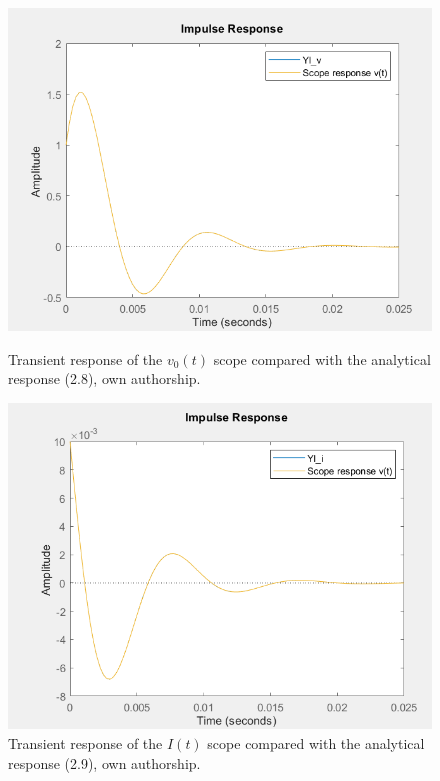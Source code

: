 \documentclass[a4paper,12pt]{article}
\begin{document}
\begin{figure}[H]
    \centering
    \begin{minipage}[b]{0.4\linewidth}
        \centering
        \includegraphics[width=\linewidth]{scopeanalyticalv.png}
        \caption{Transient response of the $v_0(t)$ scope compared with the analytical response (2.8), own authorship.}
        \label{fig:scopeanalyticalv}
    \end{minipage}
    \hspace{0.05\linewidth} %
    \begin{minipage}[b]{0.4\linewidth}
        \centering
        \includegraphics[width=\linewidth]{scopeanalyticali.png}
        \caption{Transient response of the $I(t)$ scope compared with the analytical response (2.9), own authorship.}
        \label{fig:scopeanalyticali}
    \end{minipage}
\end{figure}
\end{document}
